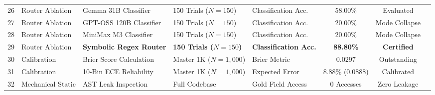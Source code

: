 \begin{table}[htbp]
{\begin{tabular}{rllllccc}
26 & Router Ablation & Gemma 31B Classifier & 150 Trials ($N=150$) & Classification Acc. & 58.00\% & Evaluated \\
27 & Router Ablation & GPT-OSS 120B Classifier & 150 Trials ($N=150$) & Classification Acc. & 20.00\% & Mode Collapse \\
28 & Router Ablation & MiniMax M3 Classifier & 150 Trials ($N=150$) & Classification Acc. & 20.00\% & Mode Collapse \\
29 & Router Ablation & \textbf{Symbolic Regex Router} & \textbf{150 Trials ($N=150$)} & \textbf{Classification Acc.} & \textbf{88.80\%} & \textbf{Certified} \\
30 & Calibration & Brier Score Calculation & Master 1K ($N=1,000$) & Brier Metric & 0.0297 & Outstanding \\
31 & Calibration & 10-Bin ECE Reliability & Master 1K ($N=1,000$) & Expected Error & 8.88\% (0.0888) & Calibrated \\
32 & Mechanical Static & AST Leak Inspection & Full Codebase & Gold Field Access & 0 Accesses & Zero Leakage \\
\bottomrule
\end{tabular}
}
\end{table}
